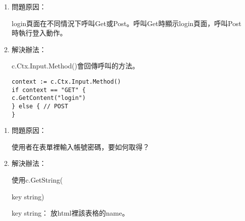 

\begin{enumerate}
	\item 問題原因：
	
	login頁面在不同情況下呼叫Get或Post。呼叫Get時顯示login頁面，呼叫Post時執行登入動作。
	
	\item 解決辦法：
	
	c.Ctx.Input.Method()會回傳呼叫的方法。
\begin{lstlisting}
context := c.Ctx.Input.Method()
if context == "GET" {
c.GetContent("login")
} else { // POST 
}
\end{lstlisting}
\end{enumerate}



\begin{enumerate}
	\item 問題原因：
	
	使用者在表單裡輸入帳號密碼，要如何取得？	
	\item 解決辦法：
	
	使用c.GetString({\color{blue}key string)
	
	key string： 放html裡該表格的name。}
	
	
\end{enumerate}



